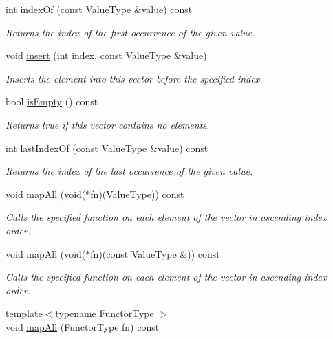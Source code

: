 \begin{DoxyCompactItemize}
int \mbox{\hyperlink{classVector_a619aacfb96804495d3182a7131cf3539}{index\+Of}} (const Value\+Type \&value) const
\begin{DoxyCompactList}\small\item\em Returns the index of the first occurrence of the given value. \end{DoxyCompactList}\item 
void \mbox{\hyperlink{classVector_a0b5f5f8e87079d043caa9e5ed00d2941}{insert}} (int index, const Value\+Type \&value)
\begin{DoxyCompactList}\small\item\em Inserts the element into this vector before the specified index. \end{DoxyCompactList}\item 
bool \mbox{\hyperlink{classVector_acf82f9b2937375c7b1cf3dccb3df3312}{is\+Empty}} () const
\begin{DoxyCompactList}\small\item\em Returns {\ttfamily true} if this vector contains no elements. \end{DoxyCompactList}\item 
int \mbox{\hyperlink{classVector_a48d608a1714954f0a7bcac6459483cb6}{last\+Index\+Of}} (const Value\+Type \&value) const
\begin{DoxyCompactList}\small\item\em Returns the index of the last occurrence of the given value. \end{DoxyCompactList}\item 
void \mbox{\hyperlink{classVector_a2931bda025b4800f128f37790d21f49f}{map\+All}} (void($\ast$fn)(Value\+Type)) const
\begin{DoxyCompactList}\small\item\em Calls the specified function on each element of the vector in ascending index order. \end{DoxyCompactList}\item 
void \mbox{\hyperlink{classVector_a395b81e6a77aa9702362198771785dfd}{map\+All}} (void($\ast$fn)(const Value\+Type \&)) const
\begin{DoxyCompactList}\small\item\em Calls the specified function on each element of the vector in ascending index order. \end{DoxyCompactList}\item 
{\footnotesize template$<$typename Functor\+Type $>$ }\\void \mbox{\hyperlink{classVector_a8dc32c1e45704cfae41daf8adb4e66dc}{map\+All}} (Functor\+Type fn) const

\end{DoxyCompactItemize}
